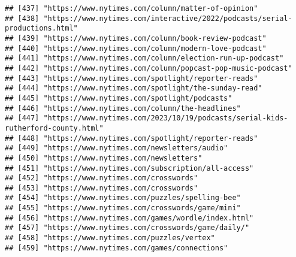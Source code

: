 \documentclass[
]{article}
\begin{document}
\begin{verbatim}
## [437] "https://www.nytimes.com/column/matter-of-opinion"                                                          
## [438] "https://www.nytimes.com/interactive/2022/podcasts/serial-productions.html"                                 
## [439] "https://www.nytimes.com/column/book-review-podcast"                                                        
## [440] "https://www.nytimes.com/column/modern-love-podcast"                                                        
## [441] "https://www.nytimes.com/column/election-run-up-podcast"                                                    
## [442] "https://www.nytimes.com/column/popcast-pop-music-podcast"                                                  
## [443] "https://www.nytimes.com/spotlight/reporter-reads"                                                          
## [444] "https://www.nytimes.com/spotlight/the-sunday-read"                                                         
## [445] "https://www.nytimes.com/spotlight/podcasts"                                                                
## [446] "https://www.nytimes.com/column/the-headlines"                                                              
## [447] "https://www.nytimes.com/2023/10/19/podcasts/serial-kids-rutherford-county.html"                            
## [448] "https://www.nytimes.com/spotlight/reporter-reads"                                                          
## [449] "https://www.nytimes.com/newsletters/audio"                                                                 
## [450] "https://www.nytimes.com/newsletters"                                                                       
## [451] "https://www.nytimes.com/subscription/all-access"                                                           
## [452] "https://www.nytimes.com/crosswords"                                                                        
## [453] "https://www.nytimes.com/crosswords"                                                                        
## [454] "https://www.nytimes.com/puzzles/spelling-bee"                                                              
## [455] "https://www.nytimes.com/crosswords/game/mini"                                                              
## [456] "https://www.nytimes.com/games/wordle/index.html"                                                           
## [457] "https://www.nytimes.com/crosswords/game/daily/"                                                            
## [458] "https://www.nytimes.com/puzzles/vertex"                                                                    
## [459] "https://www.nytimes.com/games/connections"                                                                 

\end{verbatim}
\end{document}
